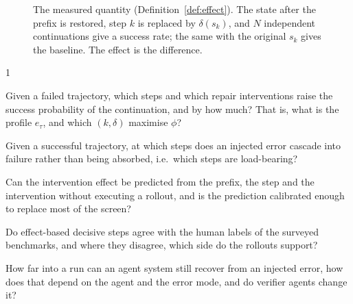 \begin{figure}[h]\centering
{}
\caption{The measured quantity (Definition~\ref{def:effect}). The state after the prefix is restored, step $k$ is replaced by $\delta(s_k)$, and $N$ independent continuations give a success rate; the same with the original $s_k$ gives the baseline. The effect is the difference.}
\label{fig:perturb}
\end{figure}

\begin{rqbox}{1}
\begin{description}[leftmargin=3.2em,style=sameline,font=\bfseries,itemsep=1.5pt]
\item[RQ\,1.1] Given a failed trajectory, which steps and which repair interventions raise the success probability of the continuation, and by how much? That is, what is the profile $e_\tau$, and which $(k,\delta)$ maximise $\phi$?
\item[RQ\,1.2] Given a successful trajectory, at which steps does an injected error cascade into failure rather than being absorbed, i.e.\ which steps are load-bearing?
\item[RQ\,1.3] Can the intervention effect be predicted from the prefix, the step and the intervention without executing a rollout, and is the prediction calibrated enough to replace most of the screen?
\item[RQ\,1.4] Do effect-based decisive steps agree with the human labels of the surveyed benchmarks, and where they disagree, which side do the rollouts support?
\item[RQ\,1.5] How far into a run can an agent system still recover from an injected error, how does that depend on the agent and the error mode, and do verifier agents change it?
\end{description}
\end{rqbox}

